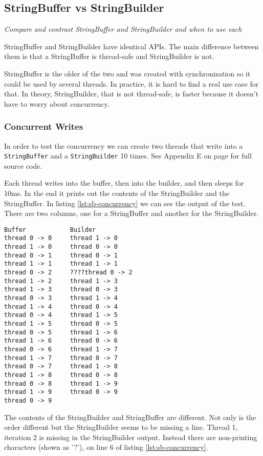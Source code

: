 \subsection{StringBuffer vs StringBuilder}
\textit{Compare and contrast StringBuffer and StringBuilder and when to use each}

StringBuffer and StringBuilder have identical APIs. The main difference between them is that a StringBuffer is thread-safe and StringBuilder is not.

StringBuffer is the older of the two and was created with synchronization so it could be used by several threads. In practice, it is hard to find a real use case for that. In theory, StringBuilder, that is not thread-safe, is faster because it doesn't have to worry about concurrency.

\subsubsection{Concurrent Writes}
In order to test the concurrency  we can create two threads that write into a \texttt{StringBuffer} and a \texttt{StringBuilder} 10 times. See Appendix E on page \pageref{App:AppendixE} for full source code.

Each thread writes into the buffer, then into the builder, and then sleeps for 10ms. In the end it prints out the contents of the StringBuilder and the StringBuffer. In listing \ref{lst:sb-concurrency} we can see the output of the test. There are two columns, one for a StringBuffer and another for the StringBuilder.  
\begin{lstlisting}[caption=StringBuffer and StringBuilder Concurrency Test, label=lst:sb-concurrency]
Buffer	          Builder
thread 0 -> 0     thread 1 -> 0
thread 1 -> 0     thread 0 -> 0
thread 0 -> 1     thread 0 -> 1
thread 1 -> 1     thread 1 -> 1
thread 0 -> 2     ????thread 0 -> 2
thread 1 -> 2     thread 1 -> 3
thread 1 -> 3     thread 0 -> 3
thread 0 -> 3     thread 1 -> 4
thread 1 -> 4     thread 0 -> 4
thread 0 -> 4     thread 1 -> 5
thread 1 -> 5     thread 0 -> 5
thread 0 -> 5     thread 1 -> 6
thread 1 -> 6     thread 0 -> 6
thread 0 -> 6     thread 1 -> 7
thread 1 -> 7     thread 0 -> 7
thread 0 -> 7     thread 1 -> 8
thread 1 -> 8     thread 0 -> 8
thread 0 -> 8     thread 1 -> 9
thread 1 -> 9     thread 0 -> 9
thread 0 -> 9     
\end{lstlisting}
\vspace{2em}

The contents of the StringBuilder and StringBuffer are different. Not only is the order different but the StringBuilder seems to be missing a line. Thread 1, iteration 2 is missing in the StringBuilder output. Instead there are non-printing characters (shown as '?'), on line 6 of listing \ref{lst:sb-concurrency}.

